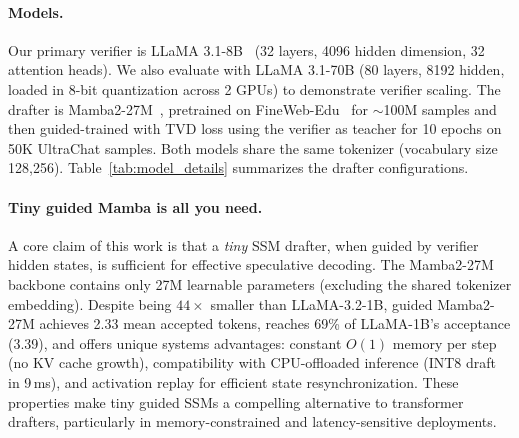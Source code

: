 \paragraph{Models.}
Our primary verifier is LLaMA 3.1-8B~\citep{dubey2024llama} (32 layers, 4096 hidden dimension, 32 attention heads).
We also evaluate with LLaMA 3.1-70B (80 layers, 8192 hidden, loaded in 8-bit quantization across 2 GPUs) to demonstrate verifier scaling.
The drafter is Mamba2-27M~\citep{dao2024transformers}, pretrained on FineWeb-Edu~\citep{penedo2024finewebedu} for $\sim$100M samples and then guided-trained with TVD loss using the verifier as teacher for 10 epochs on 50K UltraChat samples.
Both models share the same tokenizer (vocabulary size 128,256).
Table~\ref{tab:model_details} summarizes the drafter configurations.

\begin{table}[t]
\centering
\caption{Drafter model configurations.
Backbone params exclude the shared embedding/LM-head layer (66M for LLaMA tokenizer), which is tokenizer-dependent and identical across drafters.
Our Mamba2-27M backbone is $44\times$ smaller than LLaMA-3.2-1B yet, with guidance, achieves 69\% of its acceptance rate.}
\label{tab:model_details}
\vspace{0.5em}
\end{table}

\paragraph{Tiny guided Mamba is all you need.}
A core claim of this work is that a \emph{tiny} SSM drafter, when guided by verifier hidden states, is sufficient for effective speculative decoding.
The Mamba2-27M backbone contains only 27M learnable parameters (excluding the shared tokenizer embedding).
Despite being $44\times$ smaller than LLaMA-3.2-1B, guided Mamba2-27M achieves 2.33 mean accepted tokens, reaches 69\% of LLaMA-1B's acceptance (3.39), and offers unique systems advantages: constant $O(1)$ memory per step (no KV cache growth), compatibility with CPU-offloaded inference (INT8 draft in 9\,ms), and activation replay for efficient state resynchronization.
These properties make tiny guided SSMs a compelling alternative to transformer drafters, particularly in memory-constrained and latency-sensitive deployments.

